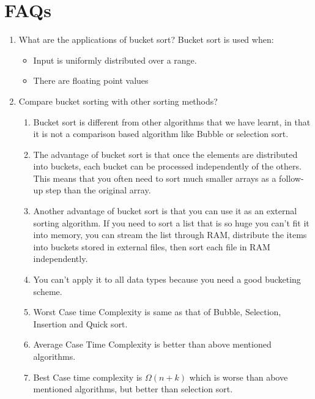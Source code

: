 \documentclass[11pt]{article}
\begin{document}
\section{FAQs}
\begin{enumerate}
	\item What are the applications of bucket sort?
	      Bucket sort is used when:
	      \begin{itemize}
		      \item Input is uniformly distributed over a range.
		      \item There are floating point values
	      \end{itemize}
	\item Compare bucket sorting with other sorting methods?
	      \begin{enumerate}
		      \item Bucket sort is different from other algorithms that we have learnt, in that it is not a comparison based algorithm like Bubble or selection sort.
		      \item The advantage of bucket sort is that once the elements are distributed into buckets, each bucket can be processed independently of the others. This means that you often need to sort much smaller arrays as a follow-up step than the original array.
		      \item Another advantage of bucket sort is that you can use it as an external sorting algorithm. If you need to sort a list that is so huge you can't fit it into memory, you can stream the list through RAM, distribute the items into buckets stored in external files, then sort each file in RAM independently.
		      \item You can't apply it to all data types because you need a good bucketing scheme.
		      \item Worst Case time Complexity is same as that of Bubble, Selection, Insertion and Quick sort.
		      \item Average Case Time Complexity is better than above mentioned algorithms.
		      \item Best Case time complexity is $\Omega(n + k)$ which is worse than above mentioned algorithms, but better than selection sort.
	      \end{enumerate}
\end{enumerate}
\end{document}
